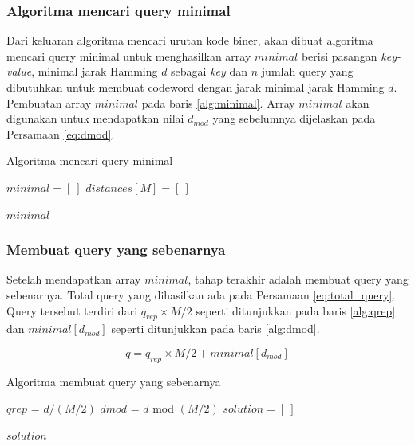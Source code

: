 \subsubsection{Algoritma mencari query minimal}

Dari keluaran algoritma mencari urutan kode biner, akan dibuat algoritma mencari query minimal untuk menghasilkan array $minimal$ berisi pasangan \textit{key-value}, minimal jarak Hamming $d$ sebagai \textit{key} dan $n$ jumlah query yang dibutuhkan untuk membuat codeword dengan jarak minimal jarak Hamming $d$. Pembuatan array $minimal$ pada baris \ref{alg:minimal}. Array $minimal$ akan digunakan untuk mendapatkan nilai $d_{mod}$ yang sebelumnya dijelaskan pada Persamaan \ref{eq:dmod}.

\begin{algorithm}[h]
\caption{Algoritma mencari query minimal}
\label{alg:generate_minimal_query}
  $minimal = [\ ]$\;
  $distances[M] = [\ ]$\;

  \For{$i = 0$ \KwTo $M-1$}{
    $min = \infty$\;
    $query = \text{generate\_query}(M, code\_order[m][i])$\;
    update the $distances$ after $query$\;
    $min$ = min($distances$)\;
    $minimal[min] = i$\;\label{alg:minimal}
    \lIf{$min \geq d$}{break}
  }
  \Return $minimal$\;
\end{algorithm}

\subsubsection{Membuat query yang sebenarnya}

Setelah mendapatkan array $minimal$, tahap terakhir adalah membuat query yang sebenarnya. Total query yang dihasilkan ada pada Persamaan \ref{eq:total_query}. Query tersebut terdiri dari $q_{rep} \times M/2$ seperti ditunjukkan pada baris \ref{alg:qrep} dan $minimal[d_{mod}]$ seperti ditunjukkan pada baris \ref{alg:dmod}.

\begin{equation}
\label{eq:total_query}
q = q_{rep} \times M/2 + minimal[d_{mod}]
\end{equation}

\begin{algorithm}[h]
\caption{Algoritma membuat query yang sebenarnya}
\label{alg:actual_query}
  $qrep$ = $d/(M/2)$\;
  $dmod$ = $d$ mod $(M/2)$\;
  $solution = [\ ]$\;


  \Return $solution$\;
\end{algorithm}

